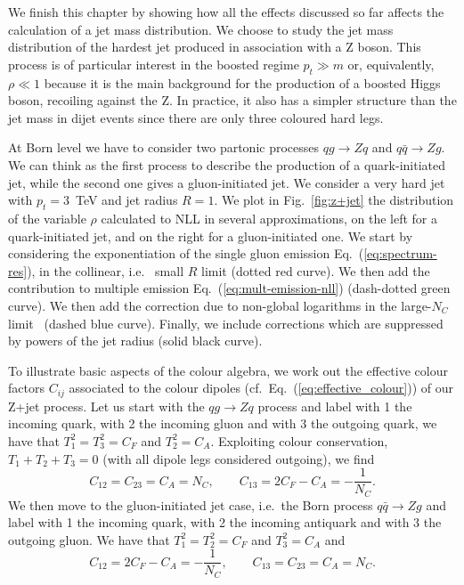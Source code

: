We finish this chapter by showing how all the effects discussed so far affects the calculation of a jet mass distribution. 
%
We choose to study the jet mass distribution of the hardest jet produced in association with a Z boson. This process is of particular interest in the boosted regime $p_t\gg m$ or, equivalently, $\rho \ll1 $ because it is the main background for the production of a boosted Higgs boson, recoiling against the Z.
%
In practice, it also has a simpler structure than the jet mass in
dijet events since there are only three coloured hard legs.

At Born level we have to consider two partonic processes
$q g  \to Z q$ and $q \bar  q \to Z g$. 
%
We can think as the first process to describe the production of a quark-initiated jet, while the second one gives a gluon-initiated jet. We consider a very hard jet with $p_t=3$~TeV and jet radius $R=1$.
%
We plot in Fig.~\ref{fig:z+jet} the distribution of the variable
$\rho$ calculated to NLL in several approximations, on the left for a
quark-initiated jet, and on the right for a gluon-initiated one. We
start by considering  the exponentiation of the single gluon emission
Eq.~(\ref{eq:spectrum-res}), in the collinear, i.e. \ small $R$ limit
(dotted red curve). We then add the contribution to multiple
emission Eq.~(\ref{eq:mult-emission-nll}) (dash-dotted green
curve). We then add the correction due to non-global logarithms in the
large-$N_C$ limit~\cite{Dasgupta:2001sh} (dashed blue curve). Finally,
we include corrections which are suppressed by powers of the jet
radius (solid black curve).

To illustrate basic aspects of the colour algebra, we work out the
effective colour factors $C_{ij}$ associated to the colour dipoles
(cf.~Eq.~(\ref{eq:effective_colour})) of our Z+jet process.
%
Let us start with the $q g \to Z q$ process and label with 1 the
incoming quark, with 2 the incoming gluon and with 3 the outgoing
quark, we have that $T_1^2=T_3^2=C_F$ and $T_2^2=C_A$. Exploiting
colour conservation, \ie $T_1+T_2+T_3=0$ (with
all dipole legs considered outgoing), we find
\begin{equation}
C_{12}=C_{23}=C_A=N_C, \qquad C_{13}=2C_F-C_A=-\frac{1}{N_C}.
\end{equation}
We then move to the gluon-initiated jet case, i.e.\ the Born process
$q \bar  q \to Z g$ and label with 1 the incoming quark, with 2 the
incoming antiquark and with 3 the outgoing gluon. We have that $T_1^2=T_2^2=C_F$ and $T_3^2=C_A$ and
\begin{equation}
C_{12}=2C_F-C_A=-\frac{1}{N_C}, \qquad C_{13}=C_{23}=C_A=N_C.
\end{equation}

